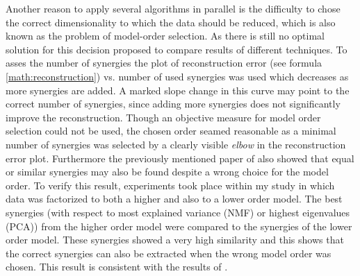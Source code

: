 Another reason to apply several algorithms in parallel is the difficulty to chose the correct dimensionality to which the data should be reduced, which is also known as the problem of model-order selection. As there is still no optimal solution for this decision \citeauthor{Tresch:2006p3766} proposed to compare results of different techniques. To asses the number of synergies the plot of reconstruction error (see formula \ref{math:reconstruction}) vs. number of used synergies was used which decreases as more synergies are added. A marked slope change in this curve may point to the correct number of synergies, since adding more synergies does not significantly improve the reconstruction. Though an objective measure for model order selection could not be used, the chosen order seamed reasonable as a minimal number of synergies was selected by a clearly visible \emph{elbow} in the reconstruction error plot. Furthermore the previously mentioned paper of \citeauthor{Tresch:2006p3766} also showed that equal or similar synergies may also be found despite a wrong choice for the model order. To verify this result, experiments took place within my study in which data was factorized to both a higher and also to a lower order model. The best synergies (with respect to most explained variance (NMF) or highest eigenvalues (PCA)) from the higher order model were compared to the synergies of the lower order model. These synergies showed a very high similarity and this shows that the correct synergies can also be extracted when the wrong model order was chosen. This result is consistent with the results of \citeauthor{Tresch:2006p3766}.



